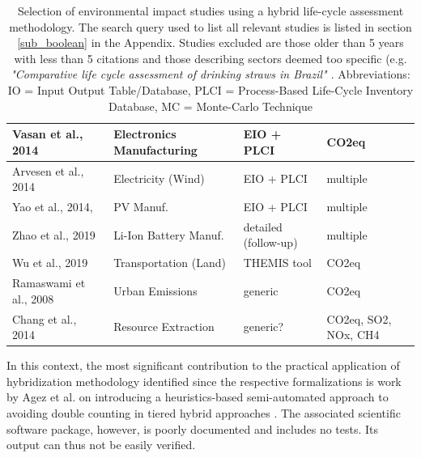 \documentclass{article}
\begin{document}
\begin{table}[H]
\begin{tabularx}{\textwidth}{| X | X | X | X |}
                \hline
                    Vasan et al., 2014 \cite{vasan_carbon_2014} & Electronics Manufacturing & EIO + PLCI & CO2eq \\
                \hline
                    Arvesen et al., 2014 \cite{arvesen_life_2014} & Electricity (Wind) & EIO + PLCI & multiple \\
                \hline
                    Yao et al., 2014, \cite{yao_hybrid_2014} & PV Manuf. & EIO + PLCI & multiple \\
                \hline
                    Zhao et al., 2019 \cite{zhao_comparative_2019} & Li-Ion Battery Manuf. & detailed (follow-up) & multiple \\
                \hline
                    Wu et al., 2019 \cite{wu_assessing_2019} & Transportation (Land) & THEMIS tool \cite{gibon_methodology_2015} & CO2eq \\
                \hline
                    Ramaswami et al., 2008 \cite{ramaswami_demand-centered_2008} & Urban Emissions & generic & CO2eq \\
                \hline
                    Chang et al., 2014 \cite{chang_shale--well_2014} & Resource Extraction & generic? & CO2eq, SO2, NOx, CH4 \\
                \hline
            \end{tabularx}
            \caption{Selection of environmental impact studies using a hybrid life-cycle assessment methodology. The search query used to list all relevant studies is listed in section \ref{sub_boolean} in the Appendix. Studies excluded are those older than 5 years with less than 5 citations and those describing sectors deemed too specific (e.g. \textit{"Comparative life cycle assessment of drinking straws in Brazil" \cite{zanghelini_comparative_2020}}. Abbreviations: IO = Input Output Table/Database, PLCI = Process-Based Life-Cycle Inventory Database, MC = Monte-Carlo Technique}
            \label{tab_studies}
        \end{table}
        
        In this context, the most significant contribution to the practical application of hybridization methodology identified since the respective formalizations is work by Agez et al. on introducing a heuristics-based semi-automated approach to avoiding double counting in tiered hybrid approaches \cite{agez_lifting_2019}\cite{agez_hybridization_2020}\cite{agez_correcting_2022}. The associated scientific software package, however, is poorly documented and includes no tests. Its output can thus not be easily verified.
        
\end{document}
